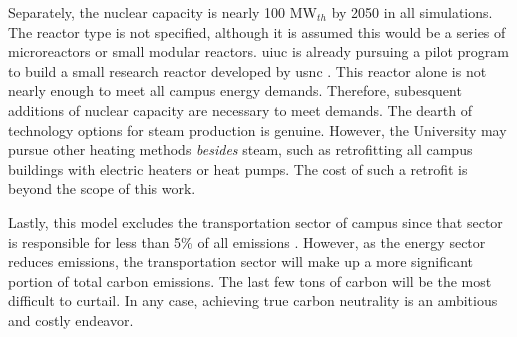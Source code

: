 Separately, the nuclear capacity is nearly 100 MW$_{th}$ by 2050 in all simulations.
The reactor type is not specified, although it is assumed this would be a series
of microreactors or small modular reactors. \gls{uiuc} is already pursuing a pilot
program to build a small
research reactor developed by \gls{usnc} \cite{noauthor_university_2021}. This reactor
alone is not nearly enough to meet all campus energy demands. Therefore, subesquent
additions of nuclear capacity are necessary to meet demands. The dearth of
technology options for steam production is genuine. However, the University may
pursue other heating methods \textit{besides} steam, such as retrofitting all
campus buildings with electric heaters or heat pumps. The cost of such a retrofit
is beyond the scope of this work.

Lastly, this model excludes the transportation sector of campus since that sector
is responsible for less than 5\% of all emissions
\cite{institute_for_sustainability_energy_and_environment_illinois_2020}. However,
as the energy sector reduces emissions, the transportation sector will make up a
more significant portion of total carbon emissions. The last few tons of carbon
will be the most difficult to curtail. In any case, achieving true carbon
neutrality is an ambitious and costly endeavor.
